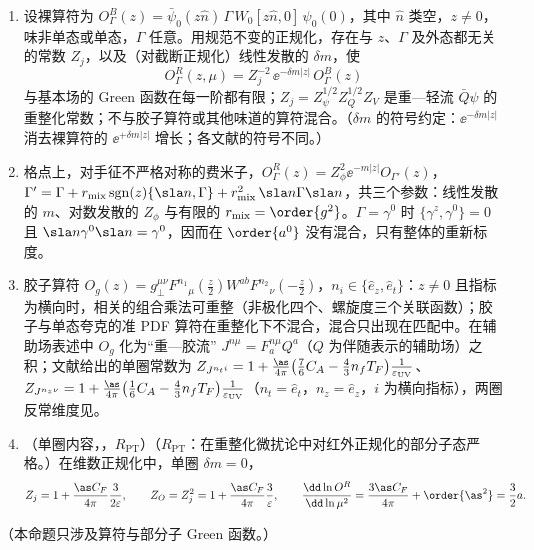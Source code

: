 \begin{proposition}\label{prop:lattice-renormalizability}
\begin{enumerate}[label=(\alph*),leftmargin=2em,itemsep=1pt,topsep=2pt]
\item 设裸算符为 $O^B_\Gamma(z)=\bar\psi_0(z\hat n)\,\Gamma\, W_0[z\hat n,0]\,\psi_0(0)$，其中 $\hat n$ 类空，$z\neq0$，味非单态或单态，$\Gamma$ 任意。用规范不变的正规化，存在与 $z$、$\Gamma$ 及外态都无关的常数 $Z_j$，以及（对截断正规化）线性发散的 $\delta m$，使
\begin{equation}\label{eq:lamet-multren}
O^R_\Gamma(z,\mu)=Z_j^{-2}\,\ee^{-\delta m|z|}\,O^B_\Gamma(z)
\end{equation}
与基本场的 Green 函数在每一阶都有限；$Z_j=Z_\psi^{1/2}Z_Q^{1/2}Z_V$ 是重—轻流 $\bar Q\psi$ 的重整化常数；不与胶子算符或其他味道的算符混合。（$\delta m$ 的符号约定：$\ee^{-\delta m|z|}$ 消去裸算符的 $\ee^{+\delta m|z|}$ 增长；各文献的符号不同。）%
\item 格点上，对手征不严格对称的费米子，$O^R_\Gamma(z)=Z_\phi^2\ee^{-m|z|}O_{\Gamma'}(z)$，$\Gamma'=\Gamma+r_{\rm mix}\,{\rm sgn}(z)\{\sla n,\Gamma\}+r_{\rm mix}^2\,\sla n\Gamma\sla n$，共三个参数：线性发散的 $m$、对数发散的 $Z_\phi$ 与有限的 $r_{\rm mix}=\order{g^2}$。$\Gamma=\gamma^0$ 时 $\{\gamma^z,\gamma^0\}=0$ 且 $\sla n\gamma^0\sla n=\gamma^0$，因而在 $\order{a^0}$ 没有混合，只有整体的重新标度。
\item 胶子算符 $O_g(z)=g_\perp^{\mu\nu}F^{n_1}{}_\mu(\tfrac z2)W^{ab}F^{n_2}{}_\nu(-\tfrac z2)$，$n_i\in\{\hat e_z,\hat e_t\}$：$z\neq0$ 且指标为横向时，相关的组合乘法可重整（非极化四个、螺旋度三个关联函数）；胶子与单态夸克的准 PDF 算符在重整化下不混合，混合只出现在匹配中。在辅助场表述中 $O_g$ 化为“重—胶流” $J^{n\mu}=F^{n\mu}_aQ^a$（$Q$ 为伴随表示的辅助场）之积；文献\cite[第~III.A~节]{JiEtAl2021}给出的单圈常数为 $Z_{J^{n_ti}}=1+\frac{\as}{4\pi}\big(\frac76C_A-\frac43n_fT_F\big)\frac1{\varepsilon_{\rm UV}}$、$Z_{J^{n_z\nu}}=1+\frac{\as}{4\pi}\big(\frac16C_A-\frac43n_fT_F\big)\frac1{\varepsilon_{\rm UV}}$（$n_t=\hat e_t$，$n_z=\hat e_z$，$i$ 为横向指标），两圈反常维度见\cite{Braun:2020ymy}。
\item （单圈内容，\tagR，$R_{\mathrm{PT}}$）（$R_{\mathrm{PT}}$：在重整化微扰论中对红外正规化的部分子态严格。）在维数正规化中，单圈 $\delta m=0$，
\begin{equation}\label{eq:lamet-Zj}
Z_j=1+\frac{\as C_F}{4\pi}\frac3{2\varepsilon},\qquad Z_O=Z_j^2=1+\frac{\as C_F}{4\pi}\frac3\varepsilon,\qquad\frac{\dd\ln O^R}{\dd\ln\mu^2}=\frac{3\as C_F}{4\pi}+\order{\as^2}=\frac32a .
\end{equation}
\end{enumerate}
（本命题只涉及算符与部分子 Green 函数。）
\end{proposition}

